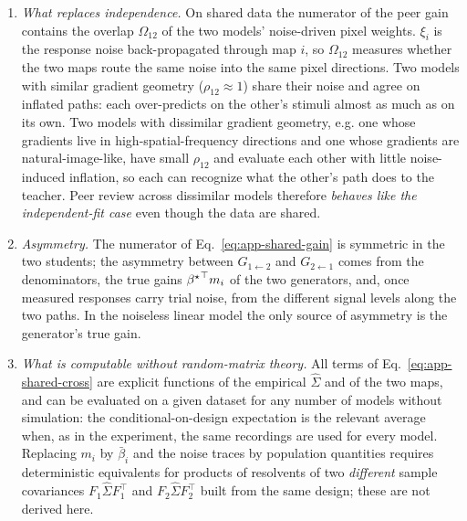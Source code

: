 \begin{remark}
\leavevmode
\begin{enumerate}
\item \emph{What replaces independence.}  On shared data the numerator of
the peer gain contains the overlap $\Omega_{12}$ of the two models'
noise-driven pixel weights.  $\xi_i$ is the response noise
back-propagated through map $i$, so $\Omega_{12}$ measures whether the two
maps route the same noise into the same pixel directions.  Two models with
similar gradient geometry ($\rho_{12}\approx1$) share their noise and agree
on inflated paths: each over-predicts on the other's stimuli almost as much
as on its own.  Two models with dissimilar gradient geometry, e.g. one whose
gradients live in high-spatial-frequency directions and one whose gradients
are natural-image-like, have small $\rho_{12}$ and evaluate each other with
little noise-induced inflation, so each can recognize what the other's path
does to the teacher.  Peer review across dissimilar models therefore \textit{behaves
like the independent-fit case} even though the data are shared.
\item \emph{Asymmetry.}  The numerator of Eq.~\ref{eq:app-shared-gain} is
symmetric in the two students; the asymmetry between $G_{1\leftarrow2}$ and
$G_{2\leftarrow1}$ comes from the denominators, the true gains
${{\beta^{\star}}}^\top m_i$ of the two generators, and, once measured responses carry
trial noise, from the different signal levels along the two paths.  In the
noiseless linear model the only source of asymmetry is the generator's true
gain.
\item \emph{What is computable without random-matrix theory.}  All terms of
Eq.~\ref{eq:app-shared-cross} are explicit functions of the empirical
$\hat\Sigma$ and of the two maps, and can be evaluated on a given dataset
for any number of models without simulation: the conditional-on-design
expectation is the relevant average when, as in the experiment, the same
recordings are used for every model.  Replacing $m_i$ by $\bar\beta_i$ and
the noise traces by population quantities requires deterministic
equivalents for products of resolvents of two \emph{different} sample
covariances $F_1\hat\Sigma F_1^\top$ and $F_2\hat\Sigma F_2^\top$ built from
the same design; these are not derived here. %
\end{enumerate}
\end{remark}

